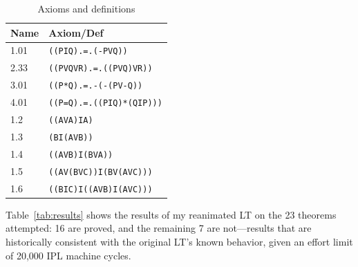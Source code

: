 \documentclass[journal]{IEEEtran}
\begin{document}
\begin{table}[h]
\centering
\caption{Axioms and definitions}
\label{tab:axioms}
\begin{tabular}{ll}
\toprule
\textbf{Name} & \textbf{Axiom/Def}\\
\midrule
1.01  & \texttt{((PIQ).=.(-PVQ))}\\
2.33  & \texttt{((PVQVR).=.((PVQ)VR))}\\
3.01  & \texttt{((P*Q).=.-(-(PV-Q))}\\
4.01  & \texttt{((P=Q).=.((PIQ)*(QIP)))}\\
1.2   & \texttt{((AVA)IA)}\\
1.3   & \texttt{(BI(AVB))}\\
1.4   & \texttt{((AVB)I(BVA))}\\
1.5   & \texttt{((AV(BVC))I(BV(AVC)))}\\
1.6   & \texttt{((BIC)I((AVB)I(AVC)))}\\
\bottomrule
\end{tabular}
\end{table}

Table~\ref{tab:results} shows the results of my reanimated LT on the
23 theorems attempted: 16 are proved, and the remaining 7 are
not---results that are historically consistent with the original LT's
known behavior, given an effort limit of 20,000 IPL machine cycles.
\end{document}
